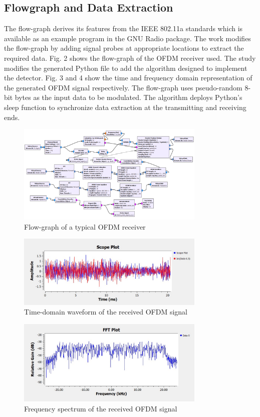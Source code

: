 \documentclass[conference]{IEEEtran}
\begin{document}
\subsection{Flowgraph and Data Extraction}
 The flow-graph derives its features from the IEEE 802.11a standards \cite{b5} which is available as an example program in the GNU Radio package. The work modifies the flow-graph by adding signal probes at appropriate locations to extract the required data. Fig. 2 shows the flow-graph of the OFDM receiver used. The study modifies the generated Python file to add the algorithm designed to implement the detector. Fig. 3 and 4 show the time and frequency domain representation of the generated OFDM signal respectively. The flow-graph uses pseudo-random 8-bit bytes as the input data to be modulated. The algorithm deploys Python's sleep function to synchronize data extraction at the transmitting and receiving ends.
 
\begin{figure}[htbp]
\centerline{\includegraphics[width=9cm]{tx_ofdm.png}}
\caption{Flow-graph of a typical OFDM receiver}
\label{flowgraph}
\end{figure}

\begin{figure}[htbp]
\centerline{\includegraphics[width=9cm]{waveform.jpg}}
\caption{Time-domain waveform of the received OFDM signal}
\label{waveform}
\end{figure}

\begin{figure}[htbp]
\centerline{\includegraphics[width=9cm]{spectrum.jpg}}
\caption{Frequency spectrum of the received OFDM signal}
\label{spectrum}
\end{figure}
\end{document}
